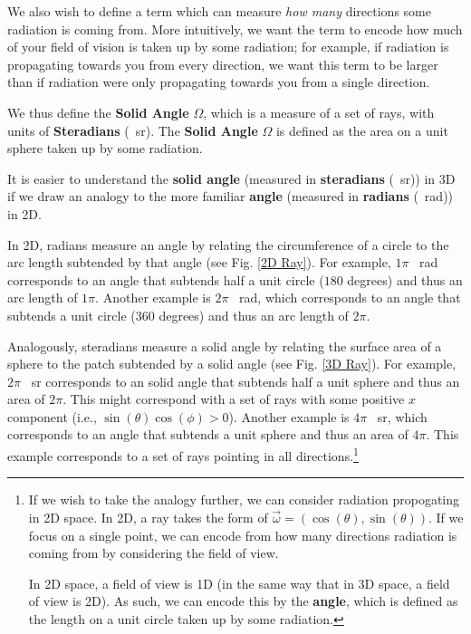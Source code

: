 We also wish to define a term which can measure \textit{how many} directions some radiation is coming from. More intuitively, we want the term to encode how much of your field of vision is taken up by some radiation; for example, if radiation is propagating towards you from every direction, we want this term to be larger than if radiation were only propagating towards you from a single direction.

We thus define the \textbf{Solid Angle} $\Omega$, which is a measure of a set of rays, with units of \textbf{Steradians} (\qty{}{\steradian}). The \textbf{Solid Angle} $\Omega$ is defined as the area on a unit sphere taken up by some radiation.

It is easier to understand the \textbf{solid angle} (measured in \textbf{steradians} (\qty{}{\steradian})) in 3D  if we draw an analogy to the more familiar \textbf{angle} (measured in \textbf{radians} (\qty{}{\radian})) in 2D.

In 2D, radians measure an angle by relating the circumference of a circle to the arc length subtended by that angle (see Fig. \ref{2D Ray}). For example, $1\pi$ \qty{}{\radian} corresponds to an angle that subtends half a unit circle ($180$ degrees) and thus an arc length of $1\pi$. Another example is $2\pi$ \qty{}{\radian}, which corresponds to an angle that subtends a unit circle ($360$ degrees) and thus an arc length of $2\pi$. 

Analogously, steradians measure a solid angle by relating the surface area of a sphere to the patch subtended by a solid angle (see Fig. \ref{3D Ray}). For example, $2\pi$ \qty{}{\steradian} corresponds to an solid angle that subtends half a unit sphere and thus an area of $2\pi$. This might correspond with a set of rays with some positive $x$ component (i.e., $\sin(\theta)\cos(\phi)>0$). Another example is $4\pi$ \qty{}{\steradian}, which corresponds to an angle that subtends a unit sphere and thus an area of $4\pi$. This example corresponds to a set of rays pointing in all directions.\footnote{
    If we wish to take the analogy further, we can consider radiation propogating in 2D space. In 2D, a ray takes the form of $\vec{\omega}=(\cos(\theta),\sin(\theta))$. If we focus on a single point, we can encode from how many directions radiation is coming from by considering the field of view.

    In 2D space, a field of view is 1D (in the same way that in 3D space, a field of view is 2D). As such, we can encode this by the \textbf{angle}, which is defined as the length on a unit circle taken up by some radiation. 
}

